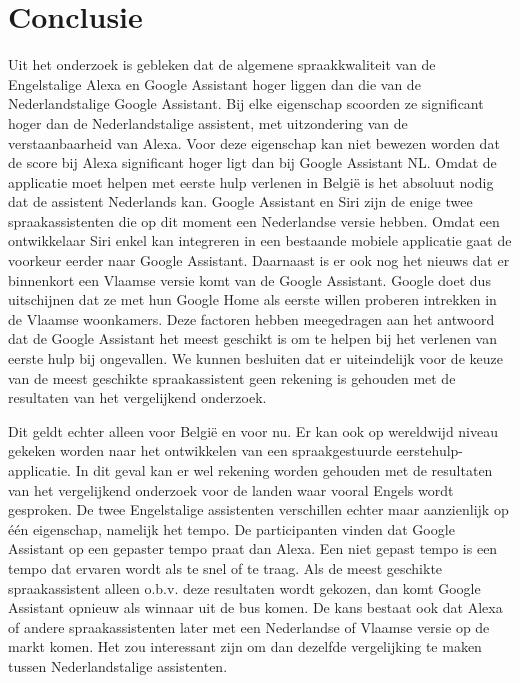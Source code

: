 
\chapter{Conclusie}
\label{ch:conclusie}

Uit het onderzoek is gebleken dat de algemene spraakkwaliteit van de Engelstalige Alexa en Google Assistant hoger liggen dan die van de Nederlandstalige Google Assistant. Bij elke eigenschap scoorden ze significant hoger dan de Nederlandstalige assistent, met uitzondering van de verstaanbaarheid van Alexa. Voor deze eigenschap kan niet bewezen worden dat de score bij Alexa significant hoger ligt dan bij Google Assistant NL.
Omdat de applicatie moet helpen met eerste hulp verlenen in België is het absoluut nodig dat de assistent Nederlands kan. Google Assistant en Siri zijn de enige twee spraakassistenten die op dit moment een Nederlandse versie hebben. Omdat een ontwikkelaar Siri enkel kan integreren in een bestaande mobiele applicatie gaat de voorkeur eerder naar Google Assistant. Daarnaast is er ook nog het nieuws dat er binnenkort een Vlaamse versie komt van de Google Assistant. Google doet dus uitschijnen dat ze met hun Google Home als eerste willen proberen intrekken in de Vlaamse woonkamers. Deze factoren hebben meegedragen aan het antwoord dat de Google Assistant het meest geschikt is om te helpen bij het verlenen van eerste hulp bij ongevallen. We kunnen besluiten dat er uiteindelijk voor de keuze van de meest geschikte spraakassistent geen rekening is gehouden met de resultaten van het vergelijkend onderzoek.

Dit geldt echter alleen voor België en voor nu. Er kan ook op wereldwijd niveau gekeken worden naar het ontwikkelen van een spraakgestuurde eerstehulp-applicatie. In dit geval kan er wel rekening worden gehouden met de resultaten van het vergelijkend onderzoek voor de landen waar vooral Engels wordt gesproken. De twee Engelstalige assistenten verschillen echter maar aanzienlijk op één eigenschap, namelijk het tempo. De participanten vinden dat Google Assistant op een gepaster tempo praat dan Alexa. Een niet gepast tempo is een tempo dat ervaren wordt als te snel of te traag. Als de meest geschikte spraakassistent alleen o.b.v. deze resultaten wordt gekozen, dan komt Google Assistant opnieuw als winnaar uit de bus komen. De kans bestaat ook dat Alexa of andere spraakassistenten later met een Nederlandse of Vlaamse versie op de markt komen. Het zou interessant zijn om dan dezelfde vergelijking te maken tussen Nederlandstalige assistenten. 

